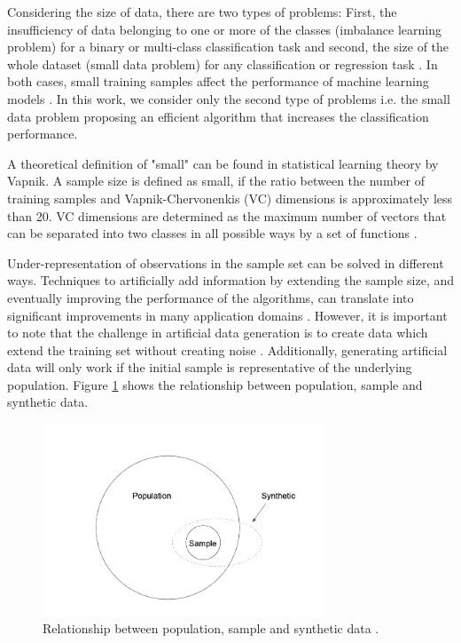 Considering the size of data, there are two types of problems: First, the insufficiency of data belonging to one or more of the classes (imbalance learning problem) for a binary or multi-class classification task and second, the size of the whole dataset (small data problem) for any classification or regression task \cite{Sezer.2014}. In both cases, small training samples affect the performance of machine learning models \cite{Tsai.2008}. In this work, we consider only the second type of problems i.e. the small data problem proposing an efficient algorithm that increases the classification performance.

A theoretical definition of "small" can be found in statistical learning theory by Vapnik. A sample size is defined as small, if the ratio between the number of training samples and Vapnik-Chervonenkis (VC) dimensions is approximately less than 20. VC dimensions are determined as the maximum number of vectors that can be separated into two classes in all possible ways by a set of functions \cite{Vapnik.2008}.

Under-representation of observations in the sample set can be solved in different ways. Techniques to artificially add information by extending the sample size, and eventually improving the performance of the algorithms, can translate into significant improvements in many application domains \cite{Sezer.2014}. However, it is important to note that the challenge in artificial data generation is to create data which extend the training set without creating noise \cite{Li.2006}. Additionally, generating artificial data will only work if the initial sample is representative of the underlying population. Figure \ref{fig:relationship} shows the relationship between population, sample and synthetic data.

\begin{figure}
	\centering
	\includegraphics[width=0.75\textwidth]{../analysis/relationship.png}
	\caption{Relationship between population, sample and synthetic data \cite{Li.2006}.}
	\label{fig:relationship}
\end{figure}

